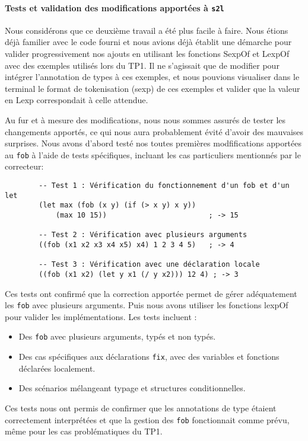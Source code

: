\documentclass{article}
\begin{document}
\paragraph{Tests et validation des modifications apportées à \texttt{s2l}}
    \begin{justify}
    Nous considérons que ce deuxième travail a été plus facile à faire. Nous étions déjà familier avec le code fourni et nous avions déjà établit une démarche pour valider progressivement nos ajouts en utilisant les fonctions SexpOf et LexpOf avec des exemples utilisés lors du TP1. Il ne s'agissait que de modifier pour intégrer l'annotation de types à ces exemples, et nous pouvions visualiser dans le terminal le format de tokenisation (sexp) de ces exemples et valider que la valeur en Lexp correspondait à celle attendue. 
    \end{justify}
    \begin{justify}
    Au fur et à mesure des modifications, nous nous sommes assurés de tester les changements apportés, ce qui nous aura probablement évité  d'avoir des mauvaises surprises. Nous avons d'abord testé nos toutes premières modfifications apportées au \texttt{fob} à l'aide de tests spécifiques, incluant les cas particuliers mentionnés par le correcteur: 
    \end{justify}
        \begin{verbatim}
        -- Test 1 : Vérification du fonctionnement d'un fob et d'un let
        (let max (fob (x y) (if (> x y) x y))
            (max 10 15))                        ; -> 15
        
        -- Test 2 : Vérification avec plusieurs arguments
        ((fob (x1 x2 x3 x4 x5) x4) 1 2 3 4 5)   ; -> 4
        
        -- Test 3 : Vérification avec une déclaration locale
        ((fob (x1 x2) (let y x1 (/ y x2))) 12 4) ; -> 3
        \end{verbatim}
    \begin{justify}
    Ces tests ont confirmé que la correction apportée permet de gérer adéquatement les \texttt{fob} avec plusieurs arguments. Puis nous avons utiliser les fonctions lexpOf pour valider les implémentations. Les tests incluent :
    \end{justify}
        \begin{itemize}
            \item Des \texttt{fob} avec plusieurs arguments, typés et non typés.
            \item Des cas spécifiques aux déclarations \texttt{fix}, avec des variables et fonctions déclarées localement.
            \item Des scénarios mélangeant typage et structures conditionnelles.
        \end{itemize}
    \begin{justify}
    Ces tests nous ont permis de confirmer que les annotations de type étaient correctement interprétées et que la gestion des \texttt{fob} fonctionnait comme prévu, même pour les cas problématiques du TP1.
    \end{justify}
\end{document}
